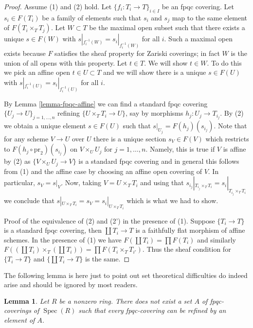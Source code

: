 \documentclass{stacks-project}
\theoremstyle{plain}
\newtheorem{lemma}[subsection]{Lemma}
\theoremstyle{definition}
\theoremstyle{remark}
\numberwithin{equation}{subsection}
\def\Spec{\mathop{\mathrm{Spec}}}
\begin{document}
\begin{proof}
Assume (1) and (2) hold.
Let $\{f_i : T_i \to T\}_{i \in I}$ be an fpqc covering. Let $s_i \in F(T_i)$
be a family of elements such that $s_i$ and $s_j$ map to the same element
of $F(T_i \times_T T_j)$. Let $W \subset T$ be the maximal open subset
such that there exists a unique $s \in F(W)$ with
$s|_{f_i^{-1}(W)} = s_i|_{f_i^{-1}(W)}$ for all $i$.
Such a maximal open exists because $F$ satisfies the
sheaf property for Zariski coverings; in fact $W$ is the
union of all opens with this property. Let $t \in T$.
We will show $t \in W$. To do this we pick an affine open
$t \in U \subset T$ and we will show there is a unique
$s \in F(U)$ with
$s|_{f_i^{-1}(U)} = s_i|_{f_i^{-1}(U)}$ for all $i$.

\medskip\noindent
By Lemma \ref{lemma-fpqc-affine} we can find a standard fpqc covering
$\{U_j \to U\}_{j = 1, \ldots, n}$ refining $\{U \times_T T_i \to U\}$,
say by morphisms $h_j : U_j \to T_{i_j}$. By (2) we obtain a unique element
$s \in F(U)$ such that $s|_{U_j} = F(h_j)(s_{i_j})$. Note that for any
scheme $V \to U$ over $U$ there is a unique section $s_V \in F(V)$
which restricts to $F(h_j \circ \text{pr}_2)(s_{i_j})$ on
$V \times_U U_j$ for $j = 1, \ldots, n$. Namely, this is true if $V$
is affine by (2) as $\{V \times_U U_j \to V\}$ is a standard fpqc covering
and in general this follows from (1) and the affine case by choosing an
affine open covering of $V$. In particular, $s_V = s|_V$.
Now, taking $V = U \times_T T_i$ and using that
$s_{i_j}|_{T_{i_j} \times_T T_i} = s_i|_{T_{i_j} \times_T T_i}$
we conclude that $s|_{U \times_T T_i} = s_V = s_i|_{U \times_T T_i}$
which is what we had to show.

\medskip\noindent
Proof of the equivalence of (2) and (2') in the presence of (1).
Suppose $\{T_i \to T\}$ is a standard fpqc covering, then
$\coprod T_i \to T$ is a faithfully flat morphism of affine schemes.
In the presence of (1) we have $F(\coprod T_i) = \prod F(T_i)$
and similarly
$F((\coprod T_i) \times_T (\coprod T_i)) = \prod F(T_i \times_T T_{i'})$.
Thus the sheaf condition for $\{T_i \to T\}$ and $\{\coprod T_i \to T\}$
is the same.
\end{proof}

\noindent
The following lemma is here just to point out set theoretical difficulties
do indeed arise and should be ignored by most readers.

\begin{lemma}
\label{lemma-no-set-of-fpqc-covers-is-initial}
Let $R$ be a nonzero ring. There does not exist a set $A$ of
fpqc-coverings of $\Spec(R)$ such that every fpqc-covering can
be refined by an element of $A$.
\end{lemma}
\end{document}
